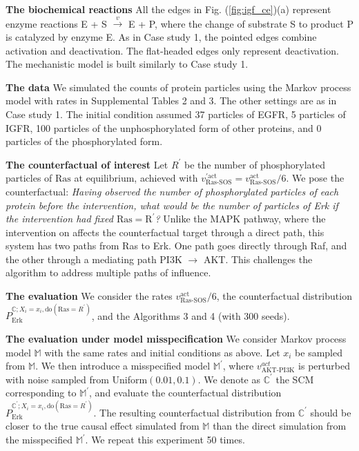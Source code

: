 \documentclass{article}
\def\figref#1{Fig. (\ref{#1})}
\begin{document}
{\bf The biochemical reactions} All the edges in \figref{fig:igf_ce}(a) represent enzyme reactions E + S $\overset{v}{\rightarrow}$ E + P, where the change of substrate S to product P is catalyzed by enzyme E. As in Case study 1, the pointed edges combine activation and deactivation. The flat-headed edges only represent deactivation. The mechanistic model is built similarly to Case study 1.

{\bf The data} We simulated the counts of protein particles using the Markov process model with rates in Supplemental Tables 2 and 3. The other settings are as in Case study 1. The initial condition assumed 37 particles of EGFR, 5 particles of IGFR, 100 particles of the unphosphorylated form of other proteins, and 0 particles of the phosphorylated form.

{\bf The counterfactual of interest} Let $R^{\prime}$ be the number of phosphorylated particles of $\text{Ras}$ at equilibrium, achieved with $v_{\text{Ras-SOS}}^{\prime \text{act}} = v_{\text{Ras-SOS}}^{\text{act}}/6$. We pose the counterfactual: \emph{Having observed the number of phosphorylated particles of each protein before the intervention, what would be the number of particles of Erk if the intervention had fixed $\text{Ras}=\text{R}^{\prime}$?} Unlike the MAPK pathway, where the  intervention on  affects the counterfactual target  through a direct path, this system has two paths from Ras to Erk. One path goes directly through Raf, and the other through a mediating path PI3K $\rightarrow$ AKT. This challenges the algorithm to address multiple paths of influence.

{\bf The evaluation} We consider the rates $v_{\text{Ras-SOS}}^{\text{act}}/6$, the counterfactual distribution $P_{\text{Erk}}^{\mathbb{C}; X_i = x_i, \text{do}(\text{Ras} = R^{\prime})}$, and the Algorithms 3 and 4 (with 300 seeds).

{\bf The evaluation under model misspecification} We consider Markov process model $\mathbb{M}$ with the same rates and initial conditions as above. Let $x_i$ be sampled from $\mathbb{M}$.
We then introduce a misspecified model $\mathbb{M}^{\prime}$, where $v^{act}_{\text{AKT-PI3K}}$ is perturbed with noise sampled from Uniform$(0.01, 0.1)$.
We denote as $\mathbb{C}^{\prime}$  the SCM corresponding to $\mathbb{M}^{\prime}$, and evaluate the counterfactual distribution $P_{\text{Erk}}^{\mathbb{C^{\prime}}; X_i = x_i, \text{do}(\text{Ras} = R^{\prime})}$.
The resulting counterfactual distribution from $\mathbb{C}^{\prime}$ should be closer to the true causal effect simulated from $\mathbb{M}$ than the direct simulation from the misspecified $\mathbb{M}^{\prime}$. We repeat this experiment 50 times.
\end{document}
